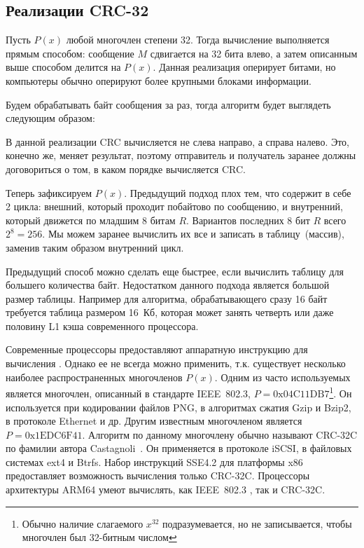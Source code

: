 \subsection{Реализации CRC-32}
Пусть $P(x)$ любой многочлен степени 32.
Тогда вычисление \crctt{} выполняется прямым способом: сообщение $M$ сдвигается на 32 бита влево, а затем описанным выше способом делится на $P(x)$.
Данная реализация оперирует битами, но компьютеры обычно оперируют более крупными блоками информации.

Будем обрабатывать байт сообщения за раз, тогда алгоритм будет выглядеть следующим образом:

В данной реализации CRC вычисляется не слева направо, а справа налево.
Это, конечно же, меняет результат, поэтому отправитель и получатель заранее должны договориться о том, в каком порядке вычисляется CRC.

Теперь зафиксируем $P(x)$.
Предыдущий подход плох тем, что содержит в себе 2 цикла: внешний, который проходит побайтово по сообщению, и внутренний, который движется по младшим 8 битам $R$.
Вариантов последних 8 бит $R$ всего $2^8 = 256$.
Мы можем заранее вычислить их все и записать в таблицу~(массив), заменив таким образом внутренний цикл.


Предыдущий способ можно сделать еще быстрее, если вычислить таблицу для большего количества байт.
% 
Недостатком данного подхода является большой размер таблицы.
Например для алгоритма, обрабатывающего сразу 16 байт требуется таблица размером 16~Кб, которая может занять четверть или даже половину L1 кэша современного процессора.

Современные процессоры предоставляют аппаратную инструкцию для вычисления \crctt{}.
Однако ее не всегда можно применить, т.к. существует несколько наиболее распространенных многочленов $P(x)$.
Одним из часто используемых является многочлен, описанный в стандарте IEEE~802.3, $P = \text{0x04C11DB7}$\footnote{Обычно наличие слагаемого $x^{32}$ подразумевается, но не записывается, чтобы многочлен был 32-битным числом}.
Он используется при кодировании файлов PNG, в алгоритмах сжатия Gzip и Bzip2, в протоколе Ethernet и др.
Другим известным многочленом является $P = \text{0x1EDC6F41}$.
Алгоритм \crctt{} по данному многочлену обычно называют \textenglish{CRC-32C} по фамилии автора Castagnoli~\cite{231911}.
Он применяется в протоколе iSCSI, в файловых системах ext4 и Btrfs.
Набор инструкций SSE4.2 для платформы x86 предоставляет возможность вычисления только \textenglish{CRC-32C}.
Процессоры архитектуры ARM64 умеют вычислять, как IEEE~802.3 \crctt{}, так и \textenglish{CRC-32C}.

